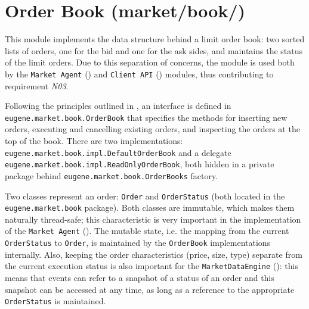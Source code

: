 \section{Order Book (market/book/)}
\label{Chapters/Implementation/Order-Book}
This module implements the data structure behind a limit order book: two sorted lists of orders, one for the bid and one for the ask sides, and maintains the status of the limit orders. Due to this separation of concerns, the module is used both by the \texttt{Market~Agent} () and \texttt{Client~API} () modules, thus contributing to requirement \textit{N03}.

Following the principles outlined in , an interface is defined in \\ \texttt{eugene.market.book.OrderBook} that specifies the methods for inserting new orders, executing and cancelling existing orders, and inspecting the orders at the top of the book. There are two implementations: \texttt{eugene.market.book.impl.DefaultOrderBook} and a delegate \texttt{eugene.market.book.impl.ReadOnlyOrderBook}, both hidden in a private package behind \texttt{eugene.market.book.OrderBooks} factory.  

Two classes represent an order: \texttt{Order} and \texttt{OrderStatus} (both located in the \texttt{eugene.market.book} package). Both classes are immutable, which makes them naturally thread-safe; this characteristic is very important in the implementation of the \texttt{Market Agent} (). The mutable state, i.e. the mapping from the current \texttt{OrderStatus} to \texttt{Order}, is maintained by the \texttt{OrderBook} implementations internally. Also, keeping the order characteristics (price, size, type) separate from the current execution status is also important for the \texttt{MarketDataEngine} (): this means that events can refer to a snapshot of a status of an order and this snapshot can be accessed at any time, as long as a reference to the appropriate \texttt{OrderStatus} is maintained.


